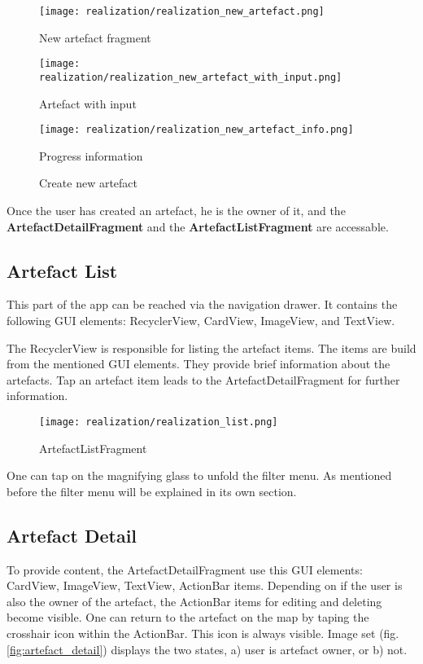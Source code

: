 \begin{figure}[htb]

  \texttt{[image: realization/realization\_new\_artefact.png]}
  \caption{New artefact    fragment}\label{fig:realization_new_artefact}
\endminipage\hfill
{}
  \texttt{[image: realization/realization\_new\_artefact\_with\_input.png]}
  \caption{Artefact with input}\label{fig:realization_new_artefact_with_input}
\endminipage\hfill
{}
  \texttt{[image: realization/realization\_new\_artefact\_info.png]}
  \caption{Progress information}\label{fig:realization_new_artefact_info}
\endminipage\hfill
\caption{Create new artefact}
\label{fig:create_artefact}
\end{figure}


Once the user has created an artefact, he is the owner of it, and the \textbf{ArtefactDetailFragment} and the \textbf{ArtefactListFragment} are accessable.

\newpage
\subsection{Artefact List}
This part of the app can be reached via the navigation drawer. It contains the following GUI elements: RecyclerView, CardView, ImageView, and TextView.

The RecyclerView is responsible for listing the artefact items. The items are build from the mentioned GUI elements. They provide brief information about the artefacts. Tap an artefact item leads to the ArtefactDetailFragment for further information.

\begin{figure}[H]
\centering
{}
  \texttt{[image: realization/realization\_list.png]}
  \caption[ArtefactListFragment]{ArtefactListFragment}
  \label{fig:realization_list}
\endminipage\hfill
\end{figure}

One can tap on the magnifying glass to unfold the filter menu. As mentioned before the filter menu will be explained in its own section.

\subsection{Artefact Detail}
To provide content, the ArtefactDetailFragment use this GUI elements: CardView, ImageView, TextView, ActionBar items. 
Depending on if the user is also the owner of the artefact, the ActionBar items for editing and deleting become visible. One can return to the artefact on the map by taping the crosshair icon within the ActionBar. This icon is always visible. Image set (fig. \ref{fig:artefact_detail}) displays the two states, a) user is artefact owner, or b) not.

